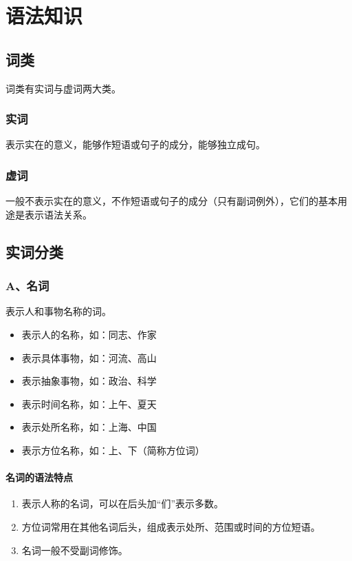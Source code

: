\chapter{语法知识}


\section*{词类}
词类有实词与虚词两大类。

\subsection*{实词}
表示实在的意义，能够作短语或句子的成分，能够独立成句。

\subsection*{虚词}
一般不表示实在的意义，不作短语或句子的成分（只有副词例外），它们的基本用途是表示语法关系。

\section{实词分类}

\subsection{A、名词}
表示人和事物名称的词。

\begin{itemize}
    \item 表示人的名称，如：同志、作家
    \item 表示具体事物，如：河流、高山
    \item 表示抽象事物，如：政治、科学
    \item 表示时间名称，如：上午、夏天
    \item 表示处所名称，如：上海、中国
    \item 表示方位名称，如：上、下（简称方位词）
\end{itemize}

\subsubsection*{名词的语法特点}
\begin{enumerate}
    \item 表示人称的名词，可以在后头加“们”表示多数。
    \item 方位词常用在其他名词后头，组成表示处所、范围或时间的方位短语。
    \item 名词一般不受副词修饰。
\end{enumerate}

